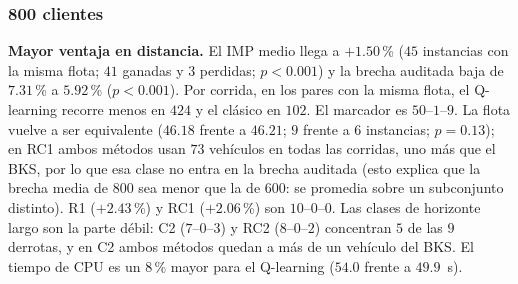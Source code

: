 \subsubsection{800 clientes}
\label{sec:exp-800}

\begin{table}[H]
\centering
\caption{Gehring y Homberger, $800$ clientes: resultados por clase.}
\label{tab:res-800}
\end{table}

\textbf{Mayor ventaja en distancia.} El IMP medio llega a $+1.50$\,\% ($45$ instancias con la
misma flota; $41$ ganadas y $3$ perdidas; $p<0.001$) y la brecha auditada baja de $7.31$\,\% a
$5.92$\,\% ($p<0.001$). Por corrida, en los pares con la misma flota, el Q-learning recorre
menos en $424$ y el clásico en $102$. El marcador es $50$--$1$--$9$. La flota vuelve a ser
equivalente ($46.18$ frente a $46.21$; $9$ frente a $6$ instancias; $p=0.13$); en RC1 ambos
métodos usan $73$ vehículos en todas las corridas, uno más que el BKS, por lo que esa clase
no entra en la brecha auditada (esto explica que la brecha media de $800$ sea menor que la de
$600$: se promedia sobre un subconjunto distinto). R1 ($+2.43$\,\%) y RC1 ($+2.06$\,\%) son
$10$--$0$--$0$. Las clases de horizonte largo son la parte débil: C2 ($7$--$0$--$3$) y RC2
($8$--$0$--$2$) concentran $5$ de las $9$ derrotas, y en C2 ambos métodos quedan a más de un
vehículo del BKS. El tiempo de CPU es un $8$\,\% mayor para el Q-learning ($54.0$ frente a
$49.9$~s).

